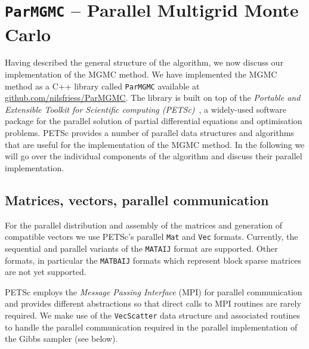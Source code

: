 \documentclass[
fontsize=11pt,
paper=a4,
numbers=noenddot
]{scrartcl}
\begin{document}


\section{\texttt{ParMGMC} -- Parallel Multigrid Monte Carlo}
Having described the general structure of the algorithm, we now discuss our implementation of the MGMC method. We have implemented the MGMC method as a C++ library called \texttt{ParMGMC} available at \url{github.com/nilsfriess/ParMGMC}. The library is built on top of the \emph{Portable and Extensible Toolkit for Scientific computing (PETSc)}~\cite{petsc-web-page,petsc-user-ref}, a widely-used software package for the parallel solution of partial differential equations and optimisation problems. PETSc provides a number of parallel data structures and algorithms that are useful for the implementation of the MGMC method. In the following we will go over the individual components of the algorithm and discuss their parallel implementation.

\subsection{Matrices, vectors, parallel communication}
For the parallel distribution and assembly of the matrices and generation of compatible vectors we use PETSc's parallel \texttt{Mat} and \texttt{Vec} formats. Currently, the sequential and parallel variants of the \texttt{MATAIJ} format are supported. Other formats, in particular the \texttt{MATBAIJ} formats which represent block sparse matrices are not yet supported. 

PETSc employs the \emph{Message Passing Interface} (MPI) for parallel communication and provides different abstractions so that direct calls to MPI routines are rarely required. We make use of the \texttt{VecScatter} data structure and associated routines to handle the parallel communication required in the parallel implementation of the Gibbs sampler (see below).
\end{document}
